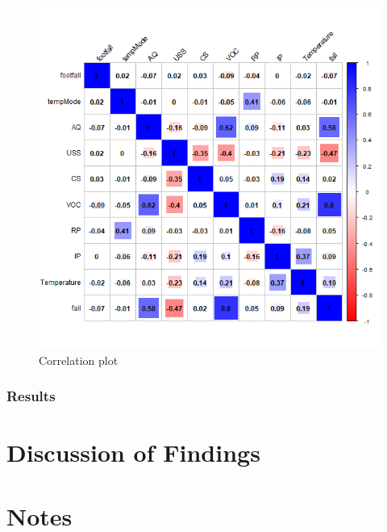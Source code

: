 \documentclass{article}
\begin{document}
\begin{figure}[H]
\centering
\includegraphics[width=0.8\linewidth]{plots_correlation_Machine.png}
\caption{\label{fig:cor_machine} Correlation plot}
\end{figure}


\subsubsection{Results}


\section{Discussion of Findings}



\section{Notes}
\end{document}
